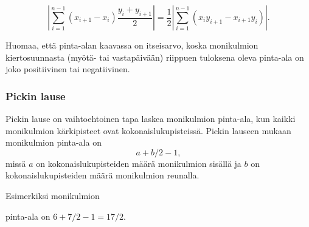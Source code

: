 \[|\sum_{i=1}^{n-1} (x_{i+1}-x_{i}) \frac{y_i+y_{i+1}}{2}| =
\frac{1}{2} |\sum_{i=1}^{n-1} (x_i y_{i+1} - x_{i+1} y_i)|.\]

Huomaa, että pinta-alan kaavassa on itseisarvo,
koska monikulmion kiertosuunnasta (myötä- tai vastapäivään)
riippuen tuloksena oleva pinta-ala on joko
positiivinen tai negatiivinen.

\subsubsection{Pickin lause}


Pickin lause on vaihtoehtoinen tapa laskea
monikulmion pinta-ala,
kun kaikki monikulmion kärkipisteet
ovat kokonaislukupisteissä.
Pickin lauseen mukaan monikulmion pinta-ala on
\[ a + b/2 -1,\]
missä $a$ on kokonaislukupisteiden määrä monikulmion sisällä
ja $b$ on kokonaislukupisteiden määrä monikulmion reunalla.

Esimerkiksi monikulmion
\begin{center}
\end{center}

pinta-ala on $6+7/2-1=17/2$.

